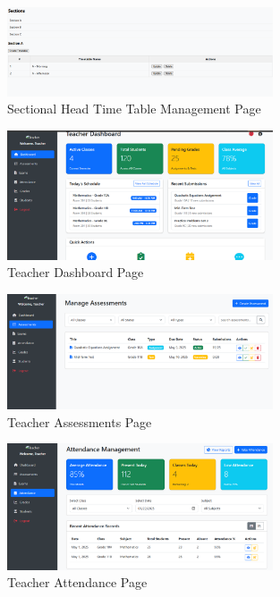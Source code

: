 \documentclass[12pt,a4paper]{report}
\begin{document}
\begin{figure}[htbp]
    \centering
    \includegraphics[width=0.7\textwidth]{sectionalhead-time table management-page.png}
    \caption{Sectional Head Time Table Management Page}
    \label{fig:sectionalhead-time-table-management-page}
\end{figure}

\begin{figure}[htbp]
    \centering
    \includegraphics[width=0.7\textwidth]{teacher -dashboard-page.png}
    \caption{Teacher Dashboard Page}
    \label{fig:teacher-dashboard-page}
\end{figure}

\begin{figure}[htbp]
    \centering
    \includegraphics[width=0.7\textwidth]{teacher-assesements-page.png}
    \caption{Teacher Assessments Page}
    \label{fig:teacher-assesements-page}
\end{figure}

\begin{figure}[htbp]
    \centering
    \includegraphics[width=0.7\textwidth]{teacher-attendance-page.png}
    \caption{Teacher Attendance Page}
    \label{fig:teacher-attendance-page}
\end{figure}
\end{document}
